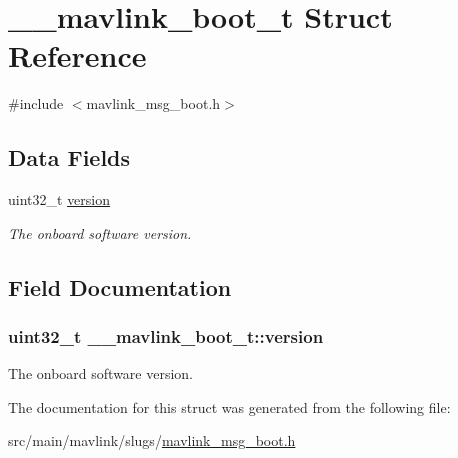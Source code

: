 \hypertarget{struct____mavlink__boot__t}{\section{\+\_\+\+\_\+mavlink\+\_\+boot\+\_\+t Struct Reference}
\label{struct____mavlink__boot__t}
}


{\ttfamily \#include $<$mavlink\+\_\+msg\+\_\+boot.\+h$>$}

\subsection*{Data Fields}
\begin{DoxyCompactItemize}
\item 
uint32\+\_\+t \hyperlink{struct____mavlink__boot__t_a62bbe43be40a832d5b01bb6aabb46f47}{version}
\begin{DoxyCompactList}\small\item\em The onboard software version. \end{DoxyCompactList}\end{DoxyCompactItemize}


\subsection{Field Documentation}
\hypertarget{struct____mavlink__boot__t_a62bbe43be40a832d5b01bb6aabb46f47}{
\subsubsection[{version}]{\setlength{\rightskip}{0pt plus 5cm}uint32\+\_\+t \+\_\+\+\_\+mavlink\+\_\+boot\+\_\+t\+::version}}\label{struct____mavlink__boot__t_a62bbe43be40a832d5b01bb6aabb46f47}


The onboard software version. 



The documentation for this struct was generated from the following file\+:\begin{DoxyCompactItemize}
\item 
src/main/mavlink/slugs/\hyperlink{mavlink__msg__boot_8h}{mavlink\+\_\+msg\+\_\+boot.\+h}\end{DoxyCompactItemize}
